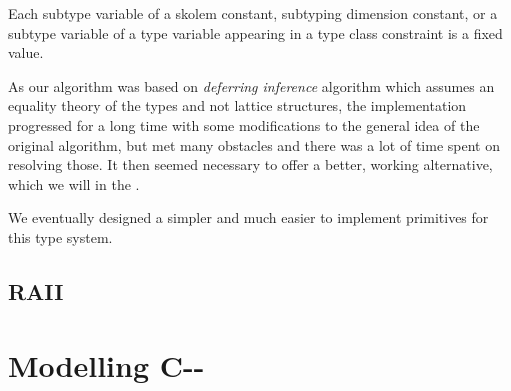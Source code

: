 \begin{defn}
    Each subtype variable of a skolem constant, subtyping dimension constant, or a subtype variable of a type variable appearing in a type class constraint is a fixed value.
\end{defn}



As our algorithm was based on \textit{deferring inference} algorithm which assumes an equality theory of the types and not lattice structures, the implementation progressed for a long time with some modifications to the general idea of the original algorithm, but met many obstacles and there was a lot of time spent on resolving those. It then seemed necessary to offer a better, working alternative, which we will in the .

We eventually designed a simpler and much easier to implement primitives for this type system. 


\subsection{RAII}

\label{RAII}




\section{Modelling C-{}-}

